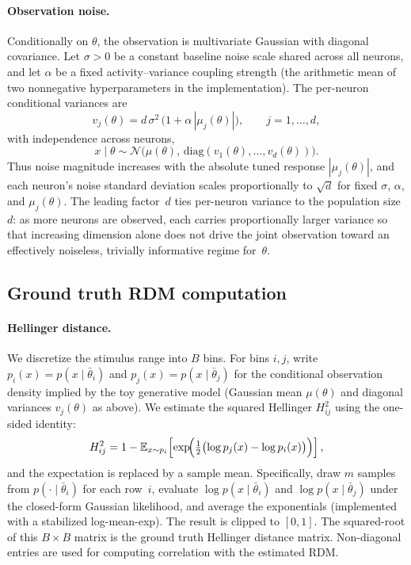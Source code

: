 \paragraph{Observation noise.}
Conditionally on $\theta$, the observation is multivariate Gaussian with diagonal covariance.
Let $\sigma > 0$ be a constant baseline noise scale shared across all neurons, and let $\alpha$ be a fixed activity--variance coupling strength (the arithmetic mean of two nonnegative hyperparameters in the implementation).
The per-neuron conditional variances are
\begin{equation}
  v_j(\theta) = d\,\sigma^{2}\,\bigl(1 + \alpha\,|\mu_j(\theta)|\bigr),
  \qquad j = 1,\ldots,d,
\end{equation}
with independence across neurons,
\begin{equation}
  x \mid \theta \sim \mathcal{N}\!\bigl(\mu(\theta),\,\mathrm{diag}(v_1(\theta),\ldots,v_d(\theta))\bigr).
\end{equation}
Thus noise magnitude increases with the absolute tuned response $|\mu_j(\theta)|$, and each neuron's noise standard deviation scales proportionally to $\sqrt{d}$ for fixed $\sigma$, $\alpha$, and $\mu_j(\theta)$.
The leading factor~$d$ ties per-neuron variance to the population size~$d$: as more neurons are observed, each carries proportionally larger variance so that increasing dimension alone does not drive the joint observation toward an effectively noiseless, trivially informative regime for~$\theta$.

\subsection{Ground truth RDM computation}

\paragraph{Hellinger distance.}
We discretize the stimulus range into $B$ bins. For bins $i,j$, write $p_i(x)=p(x\mid\bar{\theta}_i)$ and $p_j(x)=p(x\mid\bar{\theta}_j)$ for the conditional observation density implied by the toy generative model (Gaussian mean $\mu(\theta)$ and diagonal variances $v_j(\theta)$ as above). We estimate the squared Hellinger $H^2_{ij}$ using the one-sided identity:
\begin{equation}
  H^2_{ij}
  = 1 - \mathbb{E}_{x\sim p_i}\!\left[
    \exp\!\Bigl(\tfrac{1}{2}\bigl(\log p_j(x)-\log p_i(x)\bigr)\Bigr)
  \right],
\end{equation}
and the expectation is replaced by a sample mean. Specifically, draw $m$ samples from $p(\cdot\mid\bar{\theta}_i)$ for each row~$i$, evaluate $\log p(x\mid\bar{\theta}_i)$ and $\log p(x\mid\bar{\theta}_j)$ under the closed-form Gaussian likelihood, and average the exponentials (implemented with a stabilized log-mean-exp). The result is clipped to $[0,1]$. The squared-root of this $B \times B$ matrix is the ground truth Hellinger distance matrix. Non-diagonal entries are used for computing correlation with the estimated RDM.

